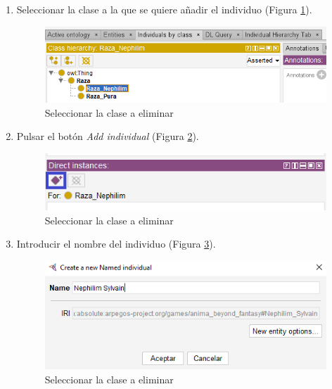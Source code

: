 \begin{enumerate}
    \item Seleccionar la clase a la que se quiere añadir el individuo (Figura \ref*{CreateIndividual_1}).
    \begin{figure}[H]
        \centering
        \includegraphics[scale=0.6]{Figures/Protege/CreateIndividual_1.png}
        \caption{Seleccionar la clase a eliminar}
        \label{CreateIndividual_1}
    \end{figure}

    \item Pulsar el botón \textit{Add individual} (Figura \ref*{CreateIndividual_2}).
    \begin{figure}[H]
        \centering
        \includegraphics[scale=0.6]{Figures/Protege/CreateIndividual_2.png}
        \caption{Seleccionar la clase a eliminar}
        \label{CreateIndividual_2}
    \end{figure}

    \item Introducir el nombre del individuo (Figura \ref*{CreateIndividual_3}).
    \begin{figure}[H]
        \centering
        \includegraphics[scale=0.6]{Figures/Protege/CreateIndividual_3.png}
        \caption{Seleccionar la clase a eliminar}
        \label{CreateIndividual_3}
    \end{figure}


\end{enumerate}
